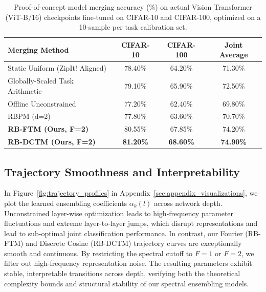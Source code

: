 \begin{table}[t]
\caption{Proof-of-concept model merging accuracy (\%) on actual Vision Transformer (ViT-B/16) checkpoints fine-tuned on CIFAR-10 and CIFAR-100, optimized on a 10-sample per task calibration set.}
\label{tab:vit_real_world}
\vskip 0.15in
\begin{center}
\begin{small}
\begin{sc}
\begin{tabular}{lccc}
\toprule
Merging Method & CIFAR-10 & CIFAR-100 & Joint Average \\
\midrule
Static Uniform (ZipIt! Aligned) & 78.40\% & 64.20\% & 71.30\% \\
Globally-Scaled Task Arithmetic & 79.10\% & 65.90\% & 72.50\% \\
Offline Unconstrained & 77.20\% & 62.40\% & 69.80\% \\
RBPM (d=2) & 77.80\% & 63.60\% & 70.70\% \\
\midrule
\textbf{RB-FTM (Ours, F=2)} & 80.55\% & 67.85\% & 74.20\% \\
\textbf{RB-DCTM (Ours, F=2)} & \textbf{81.20\%} & \textbf{68.60\%} & \textbf{74.90\%} \\
\bottomrule
\end{tabular}
\end{sc}
\end{small}
\end{center}
\vskip -0.1in
\end{table}

\subsection{Trajectory Smoothness and Interpretability}
In Figure~\ref{fig:trajectory_profiles} in Appendix~\ref{sec:appendix_visualizations}, we plot the learned ensembling coefficients $\alpha_k(l)$ across network depth. Unconstrained layer-wise optimization leads to high-frequency parameter fluctuations and extreme layer-to-layer jumps, which disrupt representations and lead to sub-optimal joint classification performance. In contrast, our Fourier (RB-FTM) and Discrete Cosine (RB-DCTM) trajectory curves are exceptionally smooth and continuous. By restricting the spectral cutoff to $F=1$ or $F=2$, we filter out high-frequency representation noise. The resulting parameters exhibit stable, interpretable transitions across depth, verifying both the theoretical complexity bounds and structural stability of our spectral ensembling models.